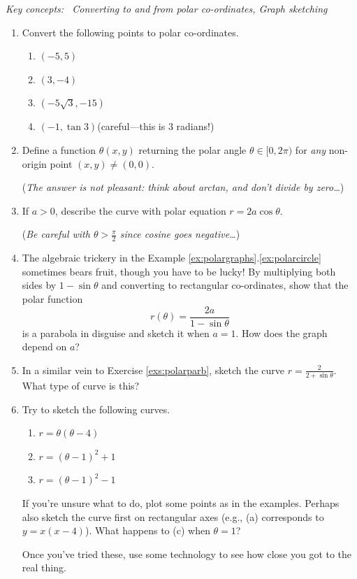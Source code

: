 \begin{exercises}{}{}
	\hangindent\leftmargini
	\emph{Key concepts: \ Converting to and from polar co-ordinates, Graph sketching}
	
	\begin{enumerate}
	  \item Convert the following points to polar co-ordinates.
	  \begin{enumerate}
	    \item $(-5,5)$
			\item $(3,-4)$
			\item $(-5\sqrt 3,-15)$
	    \item $(-1,\tan 3)$\quad (careful---this is 3 radians!)
	  \end{enumerate}
	  
	  
	  \item Define a function $\theta(x,y)$ returning the polar angle $\theta\in[0,2\pi)$ for \emph{any} non-origin point $(x,y)\neq (0,0)$.\par
	  (\emph{The answer is not pleasant: think about arctan, and don't divide by zero\ldots})
	  
	  
	  \item If $a>0$, describe the curve with polar equation $r=2a\cos\theta$.\par
	  (\emph{Be careful with $\theta>\frac\pi 2$ since cosine goes negative\ldots})
	  
	  
	  \item\label{exs:polarparb} The algebraic trickery in the Example \ref*{ex:polargraphs}.\ref{ex:polarcircle} sometimes bears fruit, though you have to be lucky! By multiplying both sides by $1-\sin\theta$ and converting to rectangular co-ordinates, show that the polar function
		\[
			r(\theta)=\frac{2a}{1-\sin\theta}
		\]
		is a parabola in disguise and sketch it when $a=1$. How does the graph depend on $a$?
		
		
		\item In a similar vein to Exercise \ref*{exs:polarparb}, sketch the curve $r=\frac 2{2+\sin\theta}$. What type of curve is this?
		
		 
	  \item Try to sketch the following curves.
		\begin{enumerate}
	  	\item $r=\theta(\theta-4)$
	  	\item $r=(\theta-1)^2+1$
	  	\item $r=(\theta-1)^2-1$
		\end{enumerate}
		If you're unsure what to do, plot some points as in the examples. Perhaps also sketch the curve first on rectangular axes (e.g.,{} (a) corresponds to $y=x(x-4)$). What happens to (c) when $\theta=1$?\par
		Once you've tried these, use some technology to see how close you got to the real thing. 
	\end{enumerate}
\end{exercises}




